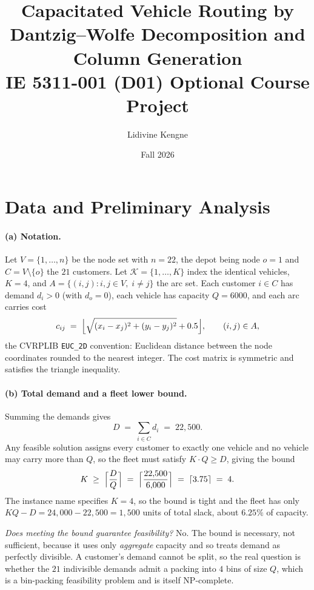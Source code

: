 \documentclass[11pt]{article}
\title{\vspace{-1.2cm}Capacitated Vehicle Routing by Dantzig--Wolfe
       Decomposition and Column Generation\\
       \large IE 5311-001 (D01) Optional Course Project}
\author{Lidivine Kengne}
\date{Fall 2026}
\begin{document}
\maketitle
\vspace{-0.9cm}

\section{Data and Preliminary Analysis}

\paragraph{(a) Notation.}
Let $V = \{1,\dots,n\}$ be the node set with $n = 22$, the depot being
node $o = 1$ and $C = V \setminus \{o\}$ the $21$ customers. Let
$\mathcal{K} = \{1,\dots,K\}$ index the identical vehicles, $K = 4$, and
$A = \{(i,j) : i,j \in V,\; i \neq j\}$ the arc set. Each customer
$i \in C$ has demand $d_i > 0$ (with $d_o = 0$), each vehicle has
capacity $Q = 6000$, and each arc carries cost
\[
  c_{ij} \;=\;
  \Bigl\lfloor \sqrt{(x_i - x_j)^2 + (y_i - y_j)^2} + 0.5 \Bigr\rfloor ,
  \qquad (i,j) \in A,
\]
the CVRPLIB \texttt{EUC\_2D} convention: Euclidean distance between the
node coordinates rounded to the nearest integer. The cost matrix is
symmetric and satisfies the triangle inequality.

\paragraph{(b) Total demand and a fleet lower bound.}
Summing the demands gives
\[
  D \;=\; \sum_{i \in C} d_i \;=\; 22{,}500 .
\]
Any feasible solution assigns every customer to exactly one vehicle and
no vehicle may carry more than $Q$, so the fleet must satisfy
$K \cdot Q \ge D$, giving the bound
\[
  K \;\ge\; \Bigl\lceil \frac{D}{Q} \Bigr\rceil
  \;=\; \Bigl\lceil \frac{22{,}500}{6{,}000} \Bigr\rceil
  \;=\; \lceil 3.75 \rceil \;=\; 4 .
\]
The instance name specifies $K = 4$, so the bound is tight and the
fleet has only $KQ - D = 24{,}000 - 22{,}500 = 1{,}500$ units of total
slack, about $6.25\%$ of capacity.

\emph{Does meeting the bound guarantee feasibility?} No. The bound is
necessary, not sufficient, because it uses only \emph{aggregate}
capacity and so treats demand as perfectly divisible. A customer's
demand cannot be split, so the real question is whether the $21$
indivisible demands admit a packing into $4$ bins of size $Q$, which
is a bin-packing feasibility problem and is itself NP-complete.
\end{document}
